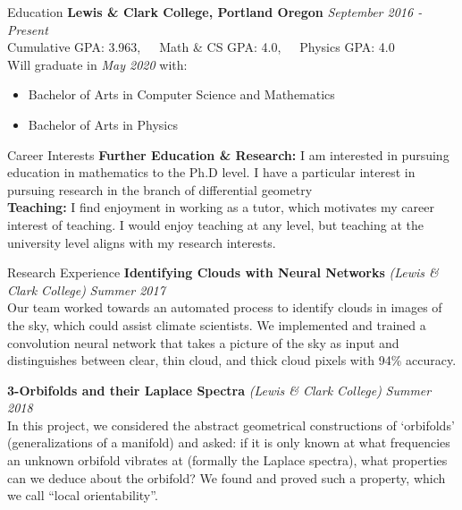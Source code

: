 \documentclass{resume}
\begin{document}
\vspace{-6.3mm}
\begin{rSection}{Education}
    \textbf{Lewis \& Clark College, Portland Oregon} \hfill \textit{September 2016 -
    Present}\\
    Cumulative GPA: 3.963,\ \ \ Math \& CS GPA: 4.0,\ \ \  Physics GPA:
    4.0\\
    Will graduate in \textit{May 2020} with:\\
    \vspace{-6.5mm}
    \begin{itemize}
        \setlength\itemsep{-2mm}
        \item Bachelor of Arts in Computer Science and Mathematics
        \item Bachelor of Arts in Physics
    \end{itemize}
    \end{rSection}
\vspace{-1mm}
\begin{rSection}{Career Interests}
    \textbf{Further Education \& Research:}
    I am interested in pursuing education in mathematics to the Ph.D level.
    I have a particular interest in pursuing research in the branch of
    differential geometry\\
    \textbf{Teaching:}
    I find enjoyment in working as a tutor, which motivates my
    career interest of teaching. I would enjoy teaching at any level, but
    teaching at the university level aligns with my research interests.
\end{rSection}
\vspace{-1mm}
\begin{rSection}{Research Experience}
    \textbf{Identifying Clouds with Neural Networks} \hfill \textit{(Lewis \&
    Clark College)} \hfill
\textit{Summer 2017}\\
Our team worked towards an automated process to identify clouds in images
of the sky, which could assist climate scientists. We
implemented and trained a convolution neural network that takes a
picture of the sky as input and distinguishes between clear, thin cloud, and
thick cloud pixels with 94\% accuracy.

\textbf{3-Orbifolds and their Laplace Spectra} \hfill \textit{(Lewis \&
    Clark College)} \hfill \textit{Summer
2018}\\
In this project, we considered the abstract geometrical constructions of
`orbifolds' (generalizations of a manifold) and asked: if it is only known
at what frequencies an unknown orbifold vibrates at (formally the Laplace
spectra), what properties can we deduce about the orbifold? We found and
proved such a property, which we call ``local orientability''.
\end{rSection}
\end{document}
